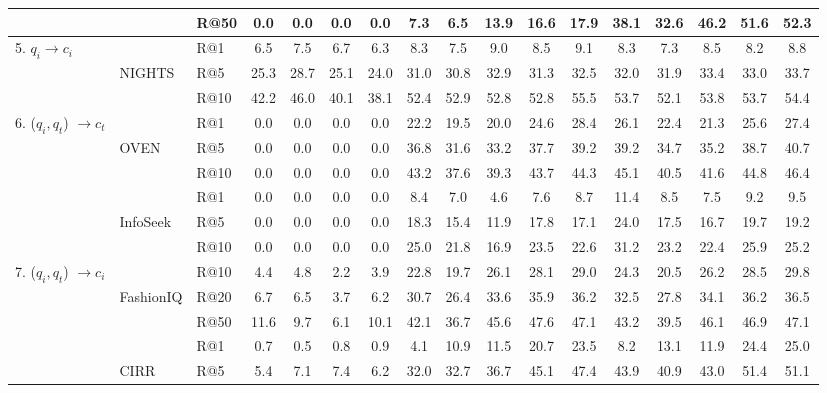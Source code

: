 \begin{table}
{\begin{tabular}{lllcccc|ccccc|ccccc}
         &           & R@50& 0.0 & 0.0 & 0.0 & 0.0 & 7.3 & 6.5 & 13.9 &16.6 & 17.9 &38.1 & 32.6 &46.2&51.6 &52.3\\
         \midrule
         \multirow{3}{*}{5. $q_i \to c_i$}
         &      & R@1 & 6.5 & 7.5 & 6.7 & 6.3 & 8.3 & 7.5 & 9.0 &8.5 & 9.1 &8.3 & 7.3 &8.5&8.2 &8.8\\
         & NIGHTS     & R@5& 25.3 & 28.7 & 25.1 & 24.0 & 31.0 & 30.8 & 32.9 &31.3 & 32.5 &32.0 & 31.9 &33.4&33.0 &33.7\\
         &      & R@10& 42.2 & 46.0 & 40.1 & 38.1 & 52.4 & 52.9 & 52.8 &52.8 & 55.5 &53.7 & 52.1 &53.8&53.7 &54.4\\
         \midrule
         \multirow{6}{*}{6. ($q_i, q_t$) $\to c_t$}
         &                        & R@1& 0.0 & 0.0 & 0.0 & 0.0 & 22.2 & 19.5 & 20.0 &24.6 & 28.4 &26.1 & 22.4 &21.3&25.6 &27.4\\
         & OVEN                       & R@5& 0.0 & 0.0 & 0.0 & 0.0 & 36.8 & 31.6 & 33.2 &37.7 & 39.2 &39.2 & 34.7 &35.2&38.7 &40.7\\
         &                        & R@10& 0.0 & 0.0 & 0.0 & 0.0 & 43.2 & 37.6 & 39.3 &43.7 & 44.3 &45.1 & 40.5 &41.6&44.8 &46.4\\
         \cmidrule(lr){2-17}
         &                & R@1& 0.0 & 0.0 & 0.0 & 0.0 & 8.4 & 7.0 & 4.6 &7.6 & 8.7 &11.4 & 8.5 &7.5&9.2 &9.5\\
         & InfoSeek               & R@5& 0.0 & 0.0 & 0.0 & 0.0 & 18.3 & 15.4 & 11.9 &17.8 & 17.1 &24.0 & 17.5 &16.7&19.7 &19.2\\
         &                & R@10& 0.0 & 0.0 & 0.0 & 0.0 & 25.0 & 21.8 & 16.9 &23.5 & 22.6 &31.2 & 23.2 &22.4&25.9 &25.2\\
         \midrule
         \multirow{6}{*}{7. ($q_i, q_t$) $\to c_i$}
         &                & R@10& 4.4 & 4.8 & 2.2 & 3.9 & 22.8 & 19.7 & 26.1 &28.1 & 29.0 &24.3 & 20.5 &26.2&28.5 &29.8\\
         & FashionIQ               & R@20& 6.7 & 6.5 & 3.7 & 6.2 & 30.7 & 26.4 & 33.6 &35.9 & 36.2 &32.5 & 27.8 &34.1&36.2 &36.5\\
         &                & R@50& 11.6 & 9.7 & 6.1 & 10.1 & 42.1 & 36.7 & 45.6 &47.6 & 47.1 &43.2 & 39.5 &46.1&46.9 &47.1\\
         \cmidrule(lr){2-17}
         &                     &  R@1& 0.7 & 0.5 & 0.8 & 0.9 & 4.1 & 10.9 & 11.5 &20.7 & 23.5 &8.2 & 13.1 &11.9&24.4 &25.0\\
         & CIRR                    & R@5 & 5.4 & 7.1 & 7.4 & 6.2 & 32.0 & 32.7 & 36.7 &45.1 & 47.4 &43.9 & 40.9 &43.0&51.4 &51.1\\

\end{tabular}}
\end{table}
